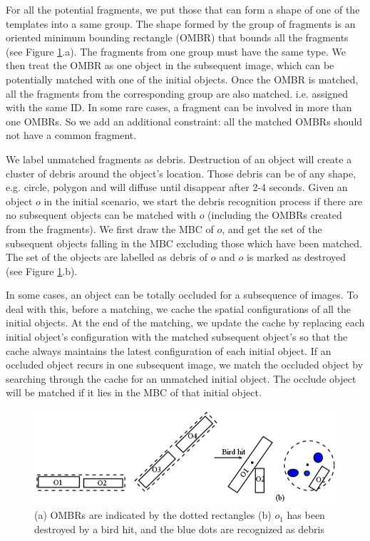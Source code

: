 \documentclass[letterpaper]{article}
\begin{document}
For all the potential fragments, we put those that can form a shape of one of the templates into a same group. The shape formed by the group of fragments is an oriented minimum bounding rectangle (OMBR) that bounds all the fragments (see Figure \ref{OMBRs}.a). The fragments from one group must have the same type. We then treat the OMBR as one object in the subsequent image, which can be potentially matched with one of the initial objects. Once the OMBR is matched, all the fragments from the corresponding group are also matched. i.e. assigned with the same ID. In some rare cases, a fragment can be involved in more than one OMBRs. So we add an additional constraint: all the matched OMBRs should not have a common fragment. 

We label unmatched fragments as debris. Destruction of an object will create a cluster of debris around the object's location. Those debris can be of any shape, e.g. circle, polygon and will diffuse until disappear after 2-4 seconds. Given an object $o$ in the initial scenario, we start the debris recognition process if there are no subsequent objects can be matched with $o$ (including the OMBRs created from the fragments). We first draw the MBC of $o$, and get the set of the subsequent objects falling in the MBC excluding those which have been matched. The set of the objects are labelled as debris of $o$ and $o$ is marked as destroyed (see Figure \ref{OMBRs}.b). 

In some cases, an object can be totally occluded for a subsequence of images. To deal with this, before a matching, we cache the spatial configurations of all the initial objects. At the end of the matching, we update the cache by replacing each initial object's configuration with the matched subsequent object's so that the cache always maintains the latest configuration of each initial object. If an occluded object recurs in one subsequent image, we match the occluded object by searching through the cache for an unmatched initial object. The occlude object will be matched if it lies in the MBC of that initial object. 


\begin{figure}[h!]
\centering\includegraphics[scale=0.3]{OMBRs.png}\caption{(a) OMBRs are indicated by the dotted rectangles (b) $o_1$ has been destroyed by a bird hit, and the blue dots are recognized as debris}  
\label{OMBRs}
\end{figure}
\end{document}
